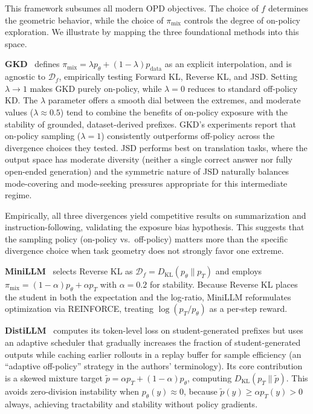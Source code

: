 \documentclass{article} %
\newcommand{\KL}{D_{\mathrm{KL}}}
\newcommand{\ptheta}{p_\theta}
\newcommand{\pteacher}{p_T}
\newcommand{\pdata}{p_{\mathrm{data}}}
\begin{document}
This framework subsumes all modern OPD objectives. The choice of $f$ determines the geometric behavior, while the choice of $\pi_{\mathrm{mix}}$ controls the degree of on-policy exploration. We illustrate by mapping the three foundational methods into this space.

\textbf{GKD}~\citep{2306.13649} defines $\pi_{\mathrm{mix}} = \lambda \ptheta + (1-\lambda)\pdata$ as an explicit interpolation, and is agnostic to $\mathcal{D}_f$, empirically testing Forward KL, Reverse KL, and JSD. Setting $\lambda \to 1$ makes GKD purely on-policy, while $\lambda = 0$ reduces to standard off-policy KD. The $\lambda$ parameter offers a smooth dial between the extremes, and moderate values ($\lambda \approx 0.5$) tend to combine the benefits of on-policy exposure with the stability of grounded, dataset-derived prefixes. GKD's experiments report that on-policy sampling ($\lambda = 1$) consistently outperforms off-policy across the divergence choices they tested. JSD performs best on translation tasks, where the output space has moderate diversity (neither a single correct answer nor fully open-ended generation) and the symmetric nature of JSD naturally balances mode-covering and mode-seeking pressures appropriate for this intermediate regime.

Empirically, all three divergences yield competitive results on summarization and instruction-following, validating the exposure bias hypothesis. This suggests that the sampling policy (on-policy vs.\ off-policy) matters more than the specific divergence choice when task geometry does not strongly favor one extreme.

\textbf{MiniLLM}~\citep{2306.08543} selects Reverse KL as $\mathcal{D}_f = \KL(\ptheta \parallel \pteacher)$ and employs $\pi_{\mathrm{mix}} = (1-\alpha)\ptheta + \alpha\pteacher$ with $\alpha = 0.2$ for stability. Because Reverse KL places the student in both the expectation and the log-ratio, MiniLLM reformulates optimization via REINFORCE, treating $\log(\pteacher/\ptheta)$ as a per-step reward.

\textbf{DistiLLM}~\citep{2402.03898} computes its token-level loss on student-generated prefixes but uses an adaptive scheduler that gradually increases the fraction of student-generated outputs while caching earlier rollouts in a replay buffer for sample efficiency (an ``adaptive off-policy'' strategy in the authors' terminology). Its core contribution is a skewed mixture target $\tilde{p} = \alpha \pteacher + (1-\alpha)\ptheta$, computing $\KL(\pteacher \parallel \tilde{p})$. This avoids zero-division instability when $\ptheta(y) \approx 0$, because $\tilde{p}(y) \ge \alpha \pteacher(y) > 0$ always, achieving tractability and stability without policy gradients.
\end{document}
